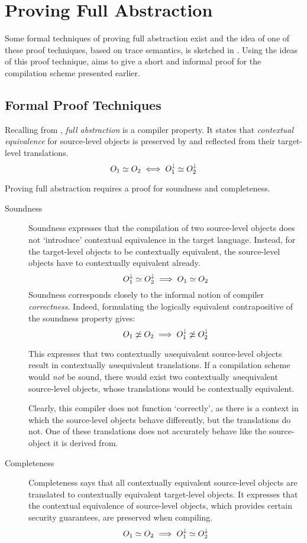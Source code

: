 \chapter{Proving Full Abstraction}
\label{chap:InformalProof}
Some formal techniques of proving full abstraction exist and the idea of one of these proof techniques, based on trace semantics, is sketched in .
Using the ideas of this proof technique,  aims to give a short and informal proof for the compilation scheme presented earlier.

\section{Formal Proof Techniques}
\label{sec:prooftechniques}
Recalling from , \emph{full abstraction} is a compiler property.
It states that \emph{contextual equivalence} for source-level objects is preserved by and reflected from their target-level translations.
\[
    O_{1} \simeq O_{2} \iff O_{1}^{\downarrow} \simeq O_{2}^{\downarrow}
\]

Proving full abstraction requires a proof for soundness  and completeness.
\begin{description}
\item[Soundness]
Soundness expresses that the compilation of two source-level objects does not `introduce' contextual equivalence in the target language.
Instead, for the target-level objects to be contextually equivalent, the source-level objects have to contextually equivalent already.
\[
    O_{1}^{\downarrow} \simeq O_{2}^{\downarrow} \implies O_{1} \simeq O_{2}
\]
Soundness corresponds closely to the informal notion of compiler \emph{correctness}.
Indeed, formulating the logically equivalent contrapositive of the soundness property gives:
\[
    O_{1} \not\simeq O_{2} \implies O_{1}^{\downarrow} \not\simeq O_{2}^{\downarrow}
\]

This expresses that two contextually \emph{un}equivalent source-level objects result in contextually \emph{un}equivalent translations.
If a compilation scheme would \emph{not} be sound, there would exist two contextually \emph{un}equivalent source-level objects, whose translations would be contextually equivalent.

Clearly, this compiler does not function `correctly', as there is a context in which the source-level objects behave differently, but the translations do not.
One of these translations does not accurately behave like the source-object it is derived from.
\item[Completeness]
Completeness says that all contextually equivalent source-level objects are translated to contextually equivalent target-level objects.
It expresses that the contextual equivalence of source-level objects, which provides certain security guarantees, are preserved when compiling.
\[
    O_{1} \simeq O_{2} \implies O_{1}^{\downarrow} \simeq O_{2}^{\downarrow}
\]
\end{description}


